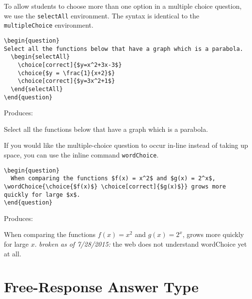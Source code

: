\documentclass{ximera}
\begin{document}
\begin{example}
To allow students to choose more than one option in a multiple choice question, we use the \verb!selectAll! environment. The syntax is identical to the \verb!multipleChoice! environment.

\begin{verbatim}
\begin{question}
Select all the functions below that have a graph which is a parabola.
  \begin{selectAll}
    \choice[correct]{$y=x^2+3x-3$}
    \choice{$y = \frac{1}{x+2}$}
    \choice[correct]{$y=3x^2+1$}
  \end{selectAll}
\end{question}
\end{verbatim}

Produces:

\begin{question}
Select all the functions below that have a graph which is a parabola.
  \begin{selectAll}
  \end{selectAll}
\end{question}

\end{example}

\begin{example}
If you would like the multiple-choice question to occur in-line instead of taking up space, you can use the inline command \verb!wordChoice!.
 
\begin{verbatim}
\begin{question}
  When comparing the functions $f(x) = x^2$ and $g(x) = 2^x$, \wordChoice{\choice{$f(x)$} \choice[correct]{$g(x)$}} grows more quickly for large $x$.
\end{question}
\end{verbatim}

Produces:

\begin{question}
  When comparing the functions $f(x) = x^2$ and $g(x) = 2^x$,  grows more quickly for large $x$.
  \emph{broken as of 7/28/2015:} the web does not understand wordChoice yet at all.
\end{question}
\end{example}

\section{Free-Response Answer Type} \label{FRAnswerType}
\end{document}
